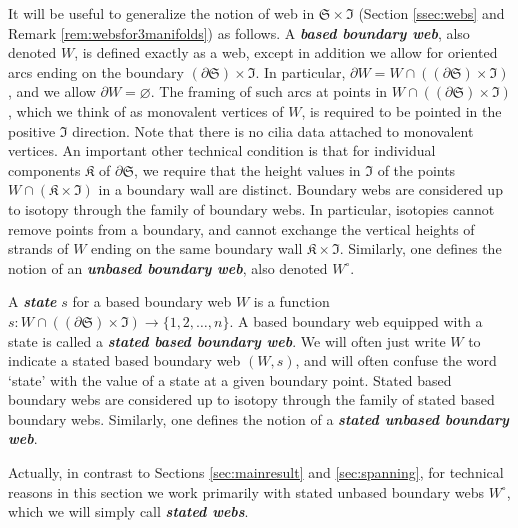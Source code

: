 \documentclass[12pt,
	]{amsart}
\theoremstyle{definition}
\renewcommand{\emptyset}{\varnothing}
\newcommand{\mfrak}[1]{\mathfrak{#1}}
\newcommand{\define}[1]{{\textit{\textbf{#1}}}}
\newcommand{\unbased}[1]{#1^\circ}
\newcommand{\surf}{\mfrak{S}}
\newcommand{\intt}{\mfrak{I}}
\newcommand{\comp}{\mfrak{K}}
\begin{document}
It will be useful to generalize the notion of web in $\surf\times\intt$ (Section \ref{ssec:webs} and Remark \ref{rem:websfor3manifolds}) as follows.  A \define{based boundary web}, also denoted $W$, is defined exactly as a web, except in addition we allow for oriented arcs ending on the boundary $(\partial\surf)\times\intt$.  In particular, $\partial W=W\cap((\partial\surf)\times\intt)$, and we allow $\partial W=\emptyset$.  The framing of such arcs at points in $W\cap((\partial\surf)\times\intt)$, which we think of as monovalent vertices of $W$, is required to be pointed in the positive $\intt$ direction.  Note that there is no cilia data attached to monovalent vertices.  An important other technical condition is that for individual components $\comp$ of $\partial\surf$, we require that the height values in $\intt$ of the points $W\cap(\comp\times\intt)$ in a boundary wall are distinct.  Boundary webs are considered up to isotopy through the family of boundary webs.  In particular, isotopies cannot remove points from a boundary, and cannot exchange the vertical heights of strands of $W$ ending on the same boundary wall $\comp\times\intt$.  Similarly, one defines the notion of an \define{unbased boundary web}, also denoted $\unbased{W}$.  

A \define{state} $s$ for a based boundary web $W$ is a function $s:W\cap((\partial\surf)\times\intt)\to\{1,2,\dots,n\}$.  A based boundary web equipped with a state is called a \define{stated based boundary web}.  We will often just write $W$ to indicate a stated based boundary web $(W,s)$, and will often confuse the word `state' with the value of a state at a given boundary point.  Stated based boundary webs are considered up to isotopy through the family of stated based boundary webs.  Similarly, one defines the notion of a \define{stated unbased boundary web}.  

Actually, in contrast to Sections \ref{sec:mainresult} and \ref{sec:spanning}, for technical reasons in this section we work primarily with stated unbased boundary webs $\unbased{W}$, which we will simply call \define{stated webs}.  
\end{document}
